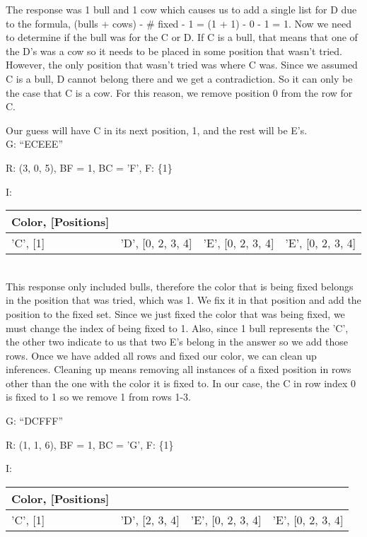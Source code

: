 \documentclass[11pt]{article}
\begin{document}
    The response was 1 bull and 1 cow which causes us to add a single list for D due to the formula, (bulls + cows) - \# fixed - 1 = (1 + 1) - 0 - 1 = 1. Now we need to determine if the bull was for the C or D. If C is a bull, that means that one of the D's was a cow so it needs to be placed in some position that wasn't tried. However, the only position that wasn't tried was where C was. Since we assumed C is a bull, D cannot belong there and we get a contradiction. So it can only be the case that C is a cow. For this reason, we remove position 0 from the row for C.

    Our guess will have C in its next position, 1, and the rest will be E's.\\

    \noindent G: \enquote{ECEEE}

    \noindent R: (3, 0, 5), BF = 1, BC = 'F', F: \{1\}

    \noindent I: \begin{tabularx}{.85\textwidth}{|X|X|X|X|}
        \hline
        Color, [Positions]&&&\\\hline 
        'C', [1]&'D', [0, 2, 3, 4]&'E', [0, 2, 3, 4]&'E', [0, 2, 3, 4]\\\hline
    \end{tabularx}\\
    
    This response only included bulls, therefore the color that is being fixed belongs in the position that was tried, which was 1. We fix it in that position and add the position to the fixed set. Since we just fixed the color that was being fixed, we must change the index of being fixed to 1. Also, since 1 bull represents the 'C', the other two indicate to us that two E's belong in the answer so we add those rows. Once we have added all rows and fixed our color, we can clean up inferences. Cleaning up means removing all instances of a fixed position in rows other than the one with the color it is fixed to. In our case, the C in row index 0 is fixed to 1 so we remove 1 from rows 1-3.

    \noindent G: \enquote{DCFFF}
    
    \noindent R: (1, 1, 6), BF = 1, BC = 'G', F: \{1\}

    \noindent I: \begin{tabularx}{.85\textwidth}{|X|X|X|X|}
        \hline
        Color, [Positions]&&&\\\hline 
        'C', [1]&'D', [2, 3, 4]&'E', [0, 2, 3, 4]&'E', [0, 2, 3, 4]\\\hline
    \end{tabularx}\\
\end{document}
